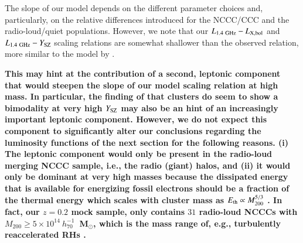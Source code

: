 \documentclass[useAMS,usenatbib]{mn2e}
\begin{document}
The slope of our model depends on the different parameter choices and,
particularly, on the relative differences introduced for the NCCC/CCC and the
radio-loud/quiet populations. However, we note that our
$L_{1.4~{\mathrm{GHz}}}-L_{{\mathrm{X,bol}}}$ and $L_{1.4~{\mathrm{GHz}}}-Y_{{\mathrm{SZ}}}$ scaling
relations are somewhat shallower than the observed relation, more similar to the
model by \cite{2009JCAP...09..024K}.  {\bf This may hint at the contribution of
  a second, leptonic component that would steepen the slope of our model scaling
  relation at high mass.  In particular, the finding of
  \cite{2013arXiv1306.4379C} that clusters do seem to show a bimodality at very
  high $Y_{{\mathrm{SZ}}}$ may also be an hint of an increasingly important leptonic
  component. However, we do not expect this component to significantly alter our
  conclusions regarding the luminosity functions of the next section for the
  following reasons. (i) The leptonic component would only be present in the
  radio-loud merging NCCC sample, i.e., the radio (giant) halos, and (ii) it
  would only be dominant at very high masses because the dissipated energy that
  is available for energizing fossil electrons should be a fraction of the
  thermal energy which scales with cluster mass as $E_{\mathrm{th}}\propto
  M_{200}^{5/3}$ \citep[][for magneto-turbulent re-acceleration
  models]{2005MNRAS.357.1313C}. In fact, our $z = 0.2$ mock sample, only
  contains $31$ radio-loud \mbox{NCCCs} with
  $M_{200}\geq5\times10^{14}~h_{70}^{-1}$~M$_{\odot}$, which is the mass range
  of, e.g., turbulently reaccelerated RHs \citep{2010A&A...509A..68C}.

}
\end{document}
